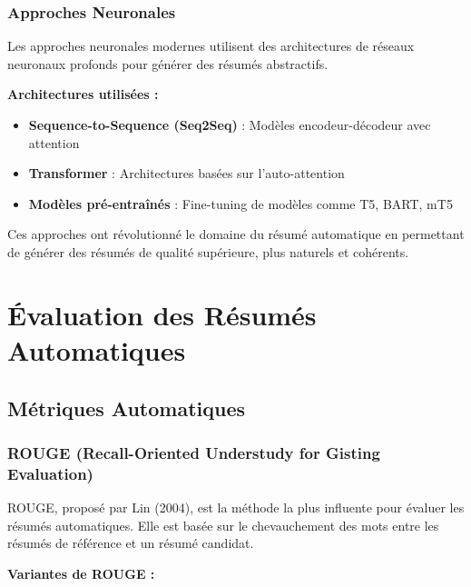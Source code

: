\subsubsection{Approches Neuronales}

Les approches neuronales modernes utilisent des architectures de réseaux neuronaux profonds pour générer des résumés abstractifs.

\textbf{Architectures utilisées :}
\begin{itemize}
    \item \textbf{Sequence-to-Sequence (Seq2Seq)} : Modèles encodeur-décodeur avec attention
    \item \textbf{Transformer} : Architectures basées sur l'auto-attention
    \item \textbf{Modèles pré-entraînés} : Fine-tuning de modèles comme T5, BART, mT5
\end{itemize}

Ces approches ont révolutionné le domaine du résumé automatique en permettant de générer des résumés de qualité supérieure, plus naturels et cohérents.

\section{Évaluation des Résumés Automatiques}

\subsection{Métriques Automatiques}

\subsubsection{ROUGE (Recall-Oriented Understudy for Gisting Evaluation)}

ROUGE, proposé par Lin (2004), est la méthode la plus influente pour évaluer les résumés automatiques. Elle est basée sur le chevauchement des mots entre les résumés de référence et un résumé candidat.

\textbf{Variantes de ROUGE :}

